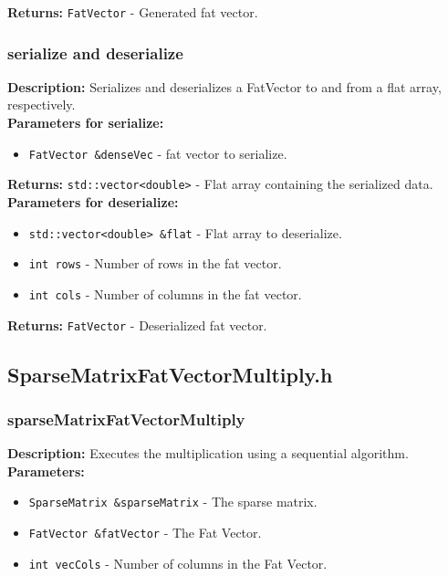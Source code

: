 \documentclass[12pt,oneside]{book} %
\begin{document}
\begin{subappendices}
    \textbf{Returns:} \texttt{FatVector} - Generated fat vector.

    \subsubsection{serialize and deserialize}
    \textbf{Description:} Serializes and deserializes a FatVector to and from a flat array, respectively.\\

    \textbf{Parameters for serialize:}
    \begin{itemize}
        \item \texttt{FatVector \&denseVec} - fat vector to serialize.
    \end{itemize}

    \textbf{Returns:} \texttt{std::vector<double>} - Flat array containing the serialized data.\\

    \textbf{Parameters for deserialize:}
    \begin{itemize}
        \item \texttt{std::vector<double> \&flat} - Flat array to deserialize.
        \item \texttt{int rows} - Number of rows in the fat vector.
        \item \texttt{int cols} - Number of columns in the fat vector.
    \end{itemize}

    \textbf{Returns:} \texttt{FatVector} - Deserialized fat vector.

    \subsection{SparseMatrixFatVectorMultiply.h}
    \subsubsection{sparseMatrixFatVectorMultiply}
    \textbf{Description:} Executes the multiplication using a sequential algorithm.\\

    \textbf{Parameters:}
    \begin{itemize}
        \item \texttt{SparseMatrix \&sparseMatrix} - The sparse matrix.
        \item \texttt{FatVector \&fatVector} - The Fat Vector.
        \item \texttt{int vecCols} - Number of columns in the Fat Vector.
    \end{itemize}


\end{subappendices}
\end{document}
